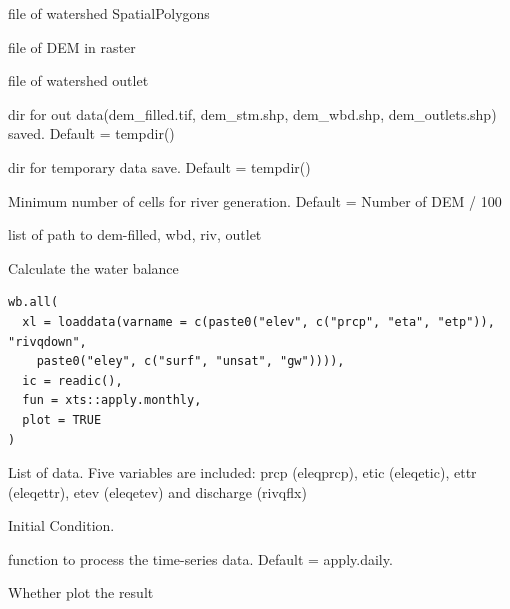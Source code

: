 \documentclass[a4paper]{book}
\begin{document}
%
\begin{Arguments}
\begin{ldescription}
\item[\code{fn.wbd}] file of watershed SpatialPolygons

\item[\code{fnr.dem}] file of DEM in raster

\item[\code{fsp.outlets}] file of watershed outlet

\item[\code{dirout}] dir for out data(dem\_filled.tif, dem\_stm.shp, dem\_wbd.shp, dem\_outlets.shp) saved. Default = tempdir()

\item[\code{dirtemp}] dir for temporary data save. Default = tempdir()

\item[\code{FlowAccCell.min}] Minimum number of cells for river generation. Default  = Number of DEM / 100
\end{ldescription}
\end{Arguments}
%
\begin{Value}
list of path to dem-filled, wbd, riv, outlet
\end{Value}
%
\begin{Description}\relax
Calculate the water balance
\end{Description}
%
\begin{Usage}
\begin{verbatim}
wb.all(
  xl = loaddata(varname = c(paste0("elev", c("prcp", "eta", "etp")), "rivqdown",
    paste0("eley", c("surf", "unsat", "gw")))),
  ic = readic(),
  fun = xts::apply.monthly,
  plot = TRUE
)
\end{verbatim}
\end{Usage}
%
\begin{Arguments}
\begin{ldescription}
\item[\code{xl}] List of data. Five variables are included: prcp (eleqprcp), etic (eleqetic), ettr (eleqettr), etev (eleqetev) and discharge (rivqflx)

\item[\code{ic}] Initial Condition.

\item[\code{fun}] function to process the time-series data. Default = apply.daily.

\item[\code{plot}] Whether plot the result
\end{ldescription}
\end{Arguments}
\end{document}

